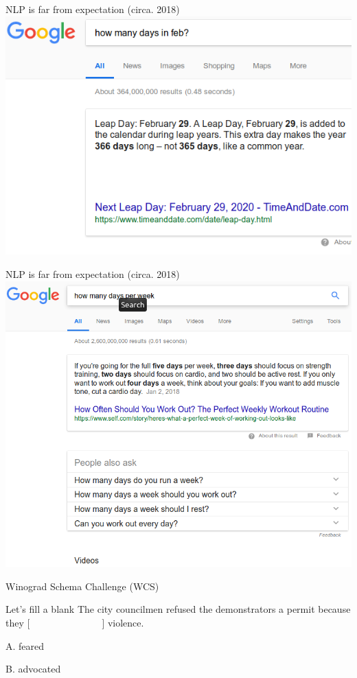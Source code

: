 \documentclass[11pt,handout]{beamer}
\begin{document}
\begin{frame}{NLP is far from expectation (circa. 2018)}
 \includegraphics[width=\textwidth]{figures/how_many_days_in_feb.png} 
\end{frame}

\begin{frame}{NLP is far from expectation (circa. 2018)}
 \includegraphics[width=\textwidth]{figures/how_many_days_per_week.png} 
\end{frame}

\begin{frame}{Winograd Schema Challenge (WCS)}
\begin{exampleblock}{Let's fill a blank}
 The city councilmen refused the demonstrators a permit because they [~~~~~~~~~~~~~~~]  violence.
 
 A. feared 
 
 B. advocated
\end{exampleblock}

 
\end{frame}
\end{document}
